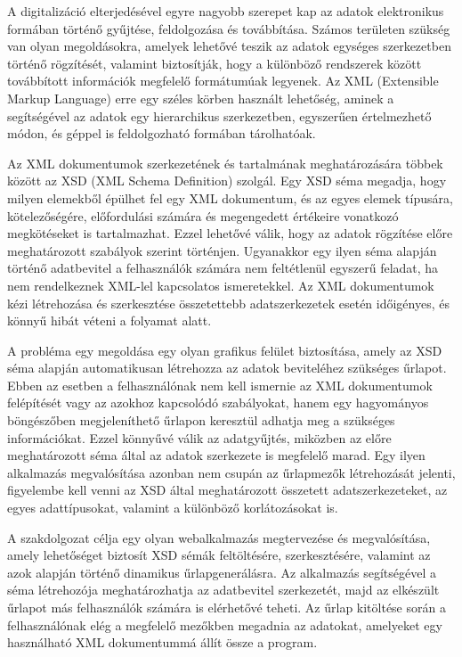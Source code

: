 
A digitalizáció elterjedésével egyre nagyobb szerepet kap az adatok elektronikus formában történő gyűjtése, feldolgozása és továbbítása. Számos területen szükség van olyan megoldásokra, amelyek lehetővé teszik az adatok egységes szerkezetben történő rögzítését, valamint biztosítják, hogy a különböző rendszerek között továbbított információk megfelelő formátumúak legyenek. Az XML (Extensible Markup Language) erre egy széles körben használt lehetőség, aminek a segítségével az adatok egy hierarchikus szerkezetben, egyszerűen értelmezhető módon, és géppel is feldolgozható formában tárolhatóak.

Az XML dokumentumok szerkezetének és tartalmának meghatározására többek között az XSD (XML Schema Definition) szolgál. Egy XSD séma megadja, hogy milyen elemekből épülhet fel egy XML dokumentum, és az egyes elemek típusára, kötelezőségére, előfordulási számára és megengedett értékeire vonatkozó megkötéseket is tartalmazhat. Ezzel lehetővé válik, hogy az adatok rögzítése előre meghatározott szabályok szerint történjen. Ugyanakkor egy ilyen séma alapján történő adatbevitel a felhasználók számára nem feltétlenül egyszerű feladat, ha nem rendelkeznek XML-lel kapcsolatos ismeretekkel. Az XML dokumentumok kézi létrehozása és szerkesztése összetettebb adatszerkezetek esetén időigényes, és könnyű hibát véteni a folyamat alatt.

A probléma egy megoldása egy olyan grafikus felület biztosítása, amely az XSD séma alapján automatikusan létrehozza az adatok beviteléhez szükséges űrlapot. Ebben az esetben a felhasználónak nem kell ismernie az XML dokumentumok felépítését vagy az azokhoz kapcsolódó szabályokat, hanem egy hagyományos böngészőben megjeleníthető űrlapon keresztül adhatja meg a szükséges információkat. Ezzel könnyűvé válik az adatgyűjtés, miközben az előre meghatározott séma által az adatok szerkezete is megfelelő marad. Egy ilyen alkalmazás megvalósítása azonban nem csupán az űrlapmezők létrehozását jelenti, figyelembe kell venni az XSD által meghatározott összetett adatszerkezeteket, az egyes adattípusokat, valamint a különböző korlátozásokat is.

A szakdolgozat célja egy olyan webalkalmazás megtervezése és megvalósítása, amely lehetőséget biztosít XSD sémák feltöltésére, szerkesztésére, valamint az azok alapján történő dinamikus űrlapgenerálásra. Az alkalmazás segítségével a séma létrehozója meghatározhatja az adatbevitel szerkezetét, majd az elkészült űrlapot más felhasználók számára is elérhetővé teheti. Az űrlap kitöltése során a felhasználónak elég a megfelelő mezőkben megadnia az adatokat, amelyeket egy használható XML dokumentummá állít össze a program.